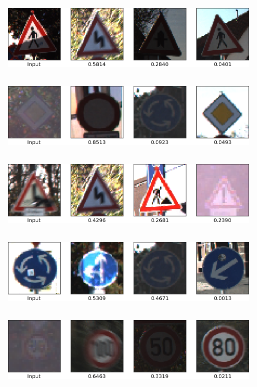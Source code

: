 \documentclass[11pt, a4paper]{article}
\begin{document}
\begin{figure}
	\centering
	\begin{subfigure}{\textwidth}
		\centering
		\caption{}
		\includegraphics[width=0.7\textwidth]{gtsrb_mistakes/mistake_fussgaenger.png}
		\label{fig:gtsrb-mistakes-01}
	\end{subfigure}
	\begin{subfigure}{\textwidth}
		\centering
		\caption{}
		\includegraphics[width=0.7\textwidth]{gtsrb_mistakes/mistake_vorfahrtstrasse.png}
		\label{fig:gtsrb-mistakes-02}
	\end{subfigure}
	\begin{subfigure}{\textwidth}
		\centering
		\caption{}
		\includegraphics[width=0.7\textwidth]{gtsrb_mistakes/mistake_gefahrenstelle.png}
		\label{fig:gtsrb-mistakes-03}
	\end{subfigure}
	\begin{subfigure}{\textwidth}
		\centering
		\caption{}
		\includegraphics[width=0.7\textwidth]{gtsrb_mistakes/mistake_kreisverkehr.png}
		\label{fig:gtsrb-mistakes-04}
	\end{subfigure}
	\begin{subfigure}{\textwidth}
		\centering
		\caption{}
		\includegraphics[width=0.7\textwidth]{gtsrb_mistakes/mistake_limit_unknown.png}

\end{subfigure}
\end{figure}
\end{document}
